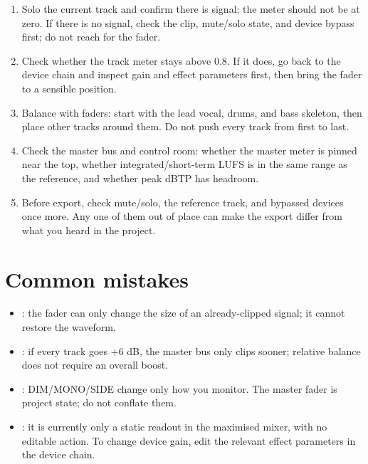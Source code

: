 \begin{enumerate}
  \item Solo the current track and confirm there is signal; the meter should not be
        at zero. If there is no signal, check the clip, mute/solo state, and device
        bypass first; do not reach for the fader.
  \item Check whether the track meter stays above 0.8. If it does, go back to the
        device chain and inspect gain and effect parameters first, then bring the
        fader to a sensible position.
  \item Balance with faders: start with the lead vocal, drums, and bass skeleton,
        then place other tracks around them. Do not push every track from first to
        last.
  \item Check the master bus and control room: whether the master meter is pinned
        near the top, whether integrated/short-term LUFS is in the same range as the
        reference, and whether peak dBTP has headroom.
  \item Before export, check mute/solo, the reference track, and bypassed devices
        once more. Any one of them out of place can make the export differ from what
        you heard in the project.
\end{enumerate}

\section{Common mistakes}

\begin{itemize}
  \item {}: the fader can only change the size
        of an already-clipped signal; it cannot restore the waveform.
  \item {}: if every track goes +6 dB, the master bus
        only clips sooner; relative balance does not require an overall boost.
  \item {}: DIM/MONO/SIDE change
        only how you monitor. The master fader is project state; do not conflate them.
  \item {}: it is currently only a
        static readout in the maximised mixer, with no editable action. To change
        device gain, edit the relevant effect parameters in the device chain.
\end{itemize}

